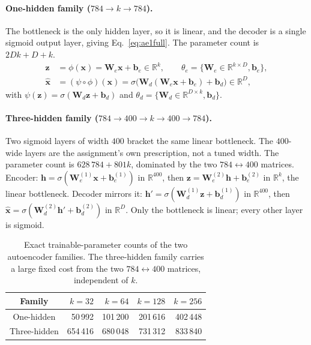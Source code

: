 \documentclass[11pt,a4paper]{article}
\newcommand{\R}{\mathbb{R}}\newcommand{\given}{\mid}\newcommand{\Acc}{\mathrm{Acc}}
\begin{document}
\paragraph{One-hidden family ($784\rightarrow k\rightarrow784$).}
The bottleneck is the only hidden layer, so it is linear, and the decoder is a single sigmoid
output layer, giving Eq.~\eqref{eq:ae1full}.  The parameter count is $2Dk+D+k$.
\begin{align}
\mathbf{z} &= \phi(\mathbf{x})=\mathbf{W}_e\mathbf{x}+\mathbf{b}_e\in\R^{k},
\qquad \theta_e=\{\mathbf{W}_e\in\R^{k\times D},\mathbf{b}_e\}, \label{eq:ae1enc}\\
\hat{\mathbf{x}} &= (\psi\circ\phi)(\mathbf{x})=\sigma\bigl(\mathbf{W}_d
(\mathbf{W}_e\mathbf{x}+\mathbf{b}_e)+\mathbf{b}_d\bigr)\in\R^{D}, \label{eq:ae1full}
\end{align}
with $\psi(\mathbf{z})=\sigma(\mathbf{W}_d\mathbf{z}+\mathbf{b}_d)$ and
$\theta_d=\{\mathbf{W}_d\in\R^{D\times k},\mathbf{b}_d\}$.

\paragraph{Three-hidden family ($784\rightarrow400\rightarrow k\rightarrow400\rightarrow784$).}
Two sigmoid layers of width $400$ bracket the same linear bottleneck.  The $400$-wide layers are
the assignment's own prescription, not a tuned width.  The parameter count is
$628\,784+801k$, dominated by the two $784\leftrightarrow400$ matrices.
Encoder: $\mathbf{h}=\sigma(\mathbf{W}_e^{(1)}\mathbf{x}+\mathbf{b}_e^{(1)})$ in $\R^{400}$, then
$\mathbf{z}=\mathbf{W}_e^{(2)}\mathbf{h}+\mathbf{b}_e^{(2)}$ in $\R^{k}$, the linear bottleneck.
Decoder mirrors it: $\mathbf{h}'=\sigma(\mathbf{W}_d^{(1)}\mathbf{z}+\mathbf{b}_d^{(1)})$ in
$\R^{400}$, then $\hat{\mathbf{x}}=\sigma(\mathbf{W}_d^{(2)}\mathbf{h}'+\mathbf{b}_d^{(2)})$ in
$\R^{D}$.  Only the bottleneck is linear; every other layer is sigmoid.

\begin{table}[htbp]\centering
\caption{Exact trainable-parameter counts of the two autoencoder families.  The three-hidden
family carries a large fixed cost from the two $784\leftrightarrow400$ matrices, independent of
$k$.}\label{tab:aeparams}
\begin{tabular}{@{}crrrr@{}}
\toprule Family & $k=32$ & $k=64$ & $k=128$ & $k=256$ \\ \midrule
One-hidden   & 50\,992 & 101\,200 & 201\,616 & 402\,448 \\
Three-hidden & 654\,416 & 680\,048 & 731\,312 & 833\,840 \\
\bottomrule
\end{tabular}
\end{table}
\end{document}

